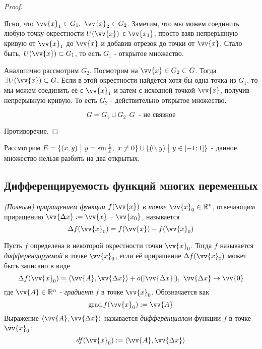 \begin{proof}
\begin{itemize}
		 Ясно, что $\vv{x}_1 \in G_1,\ \vv{x}_2 \in G_2$. Заметим, что мы можем соединить любую точку окрестности $U(\vv{x})$ с $\vv{x_1}$, просто взяв непрерывную кривую от $\vv{x}_1$ до $\vv{x}$ и добавив отрезок до точки от $\vv{x}$. Стало быть, $U(\vv{x}) \subset G_1$, то есть $G_1$ - открытое множество.
		 
		 Аналогично рассмотрим $G_2$. Посмотрим на  $\vv{x} \in G_2 \subset G$. Тогда $\exists U(\vv{x}) \subset G$. Если в этой окрестности найдётся хотя бы одна точка из $G_1$, то мы можем соединить её с $\vv{x}_1$ и затем с исходной точкой $\vv{x}$, получив непрерывную кривую. То есть $G_2$ - действительно открытое множество.
		 
		 \[
		  G = G_1 \sqcup G_2 \ \ G \ \text{ - не связное}
		 \]
	\end{itemize}
	Противоречие.
\end{proof}

\begin{example}
	Рассмотрим $E = \{(x, y) \ \big|\  y = \sin \frac{1}{x},\ x \neq 0\} \cup \{(0, y) \ \big|\  y \in [-1; 1]\}$ - данное множество нельзя разбить на два открытых.
\end{example}

\subsection{Дифференцируемость функций многих переменных}

\begin{definition}
	\textit{(Полным) приращением функции $f(\vv{x})$ в точке} $\vv{x}_0 \in \R^n$, отвечающим приращению $\vv{\Delta x} := \vv{x} - \vv{x_0}$, называется
	\[
		\Delta f(\vv{x}_0) = f(\vv{x}) - f(\vv{x}_0)
	\]
\end{definition}

\begin{definition}
	Пусть $f$ определена в некоторой окрестности точки $\vv{x}_0$. Тогда $f$ называется \textit{дифференцируемой} в точке $\vv{x}_0$, если её приращение $\Delta f(\vv{x}_0)$ может быть записано в виде
	\[
		\Delta f(\vv{x}_0) = \trbr{\vv{A}, \vv{\Delta x}} + o(|\vv{\Delta x}|),\ \vv{\Delta x} \to \vv{0}
	\]
	где $\vv{A} \in \R^n$ - \textit{градиент} $f$ в точке $\vv{x}_0$. Обозначается как
	\[
		\grad f(\vv{x}_0) := \vv{A}
	\]
	Выражение $\trbr{\vv{A}, \vv{\Delta x}}$ называется \textit{дифференциалом} функции $f$ в точке $\vv{x}_0$:
	\[
		df(\vv{x}_0) := \trbr{\vv{A}, \vv{\Delta x}}
	\]
\end{definition}

